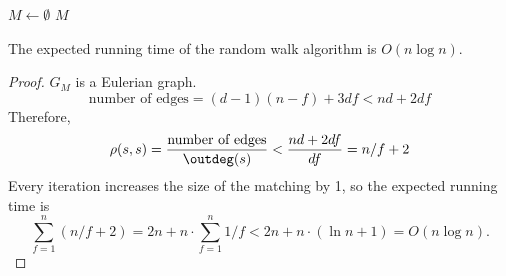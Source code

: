 \begin{algorithm}[H]
	\caption{Random Walk Algorithm}
	$M \gets \emptyset$\;
	\Return $M$\;
\end{algorithm}
\begin{theorem}
	The expected running time of the random walk algorithm is $O(n \log n)$.
\end{theorem}
\begin{proof}
	$G_M$ is a Eulerian graph.
	\[\text{number of edges} = (d-1)(n-f) + 3df < nd + 2df\]
	Therefore,
	\[\rho(s,s) = \frac{\text{number of edges}}{\outdeg(s)} < \frac{nd + 2df}{df} = n/f + 2\]
	Every iteration increases the size of the matching by 1, so the expected running time is
	\[
		\sum_{f=1}^{n} (n/f + 2) = 2n + n\cdot \sum_{f=1}^{n} 1/f < 2n + n \cdot (\ln n + 1) = O(n \log n).
	\]
\end{proof}

























